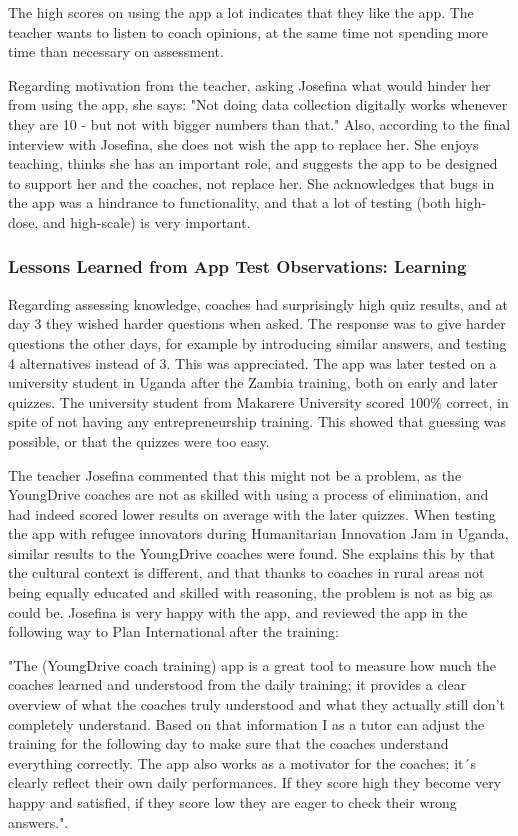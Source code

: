     The high scores on using the app a lot indicates that they like the app. The teacher wants to listen to coach opinions, at the same time not spending more time than necessary on assessment.

Regarding motivation from the teacher, asking Josefina what would hinder her from using the app, she says: "Not doing data collection digitally works whenever they are 10 - but not with bigger numbers than that." Also, according to the final interview with Josefina, she does not wish the app to replace her. She enjoys teaching, thinks she has an important role, and suggests the app to be designed to support her and the coaches, not replace her. She acknowledges that bugs in the app was a hindrance to functionality, and that a lot of testing (both high-dose, and high-scale) is very important.

\subsubsection{Lessons Learned from App Test Observations: Learning}
Regarding assessing knowledge, coaches had surprisingly high quiz results, and at day 3 they wished harder questions when asked. The response was to give harder questions the other days, for example by introducing similar answers, and testing 4 alternatives instead of 3. This was appreciated. The app was later tested on a university student in Uganda after the Zambia training, both on early and later quizzes. The university student from Makarere University scored 100\% correct, in spite of not having any entrepreneurship training. This showed that guessing was possible, or that the quizzes were too easy.

The teacher Josefina commented that this might not be a problem, as the YoungDrive coaches are not as skilled with using a process of elimination, and had indeed scored lower results on average with the later quizzes. When testing the app with refugee innovators during Humanitarian Innovation Jam in Uganda, similar results to the YoungDrive coaches were found. She explains this by that the cultural context is different, and that thanks to coaches in rural areas not being equally educated and skilled with reasoning, the problem is not as big as could be. Josefina is very happy with the app, and reviewed the app in the following way to Plan International after the training:

"The (YoungDrive coach training) app is a great tool to measure how much the coaches learned and understood from the daily training; it provides a clear overview of what the coaches truly understood and what they actually still don’t completely understand. Based on that information I as a tutor can adjust the training for the following day to make sure that the coaches understand everything correctly. The app also works as a motivator for the coaches; it´s clearly reflect their own daily performances. If they score high they become very happy and satisfied, if they score low they are eager to check their wrong answers.".

